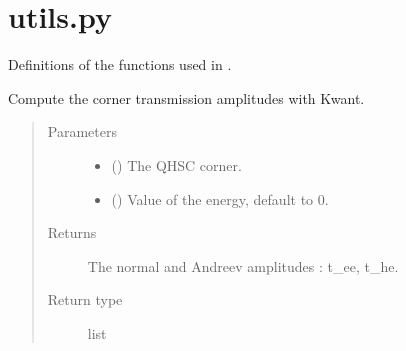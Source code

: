\documentclass[letterpaper,10pt,english]{sphinxmanual}
\begin{document}
\section{utils.py}
\label{\detokenize{modules:module-modules.utils}}\label{\detokenize{modules:utils-py}}
\sphinxAtStartPar
Definitions of the functions used in .

\begin{fulllineitems}
\label{\detokenize{modules:modules.utils.compute_corner_transmissions}}
\pysigstartsignatures
{}
\pysigstopsignatures
\sphinxAtStartPar
Compute the corner transmission amplitudes with Kwant.
\begin{quote}\begin{description}
\item[{Parameters}] \leavevmode\begin{itemize}
\item {} 
\sphinxAtStartPar
{} () \textendash{} The QH\sphinxhyphen{}SC corner.

\item {} 
\sphinxAtStartPar
{} () \textendash{} Value of the energy, default to 0.

\end{itemize}

\item[{Returns}] \leavevmode
\sphinxAtStartPar
The normal and Andreev amplitudes : t\_ee, t\_he.

\item[{Return type}] \leavevmode
\sphinxAtStartPar
list

\end{description}\end{quote}

\end{fulllineitems}

\end{document}

